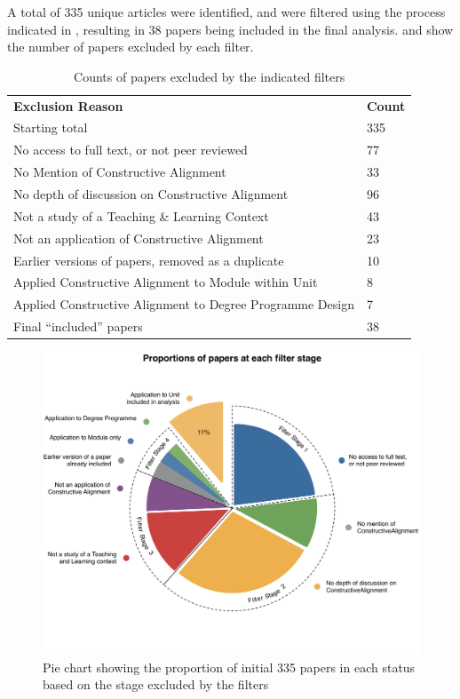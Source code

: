 A total of 335 unique articles were identified, and were filtered using the process indicated in , resulting in 38 papers being included in the final analysis.  and  show the number of papers excluded by each filter.

\begin{table}[p]
	\centering
	\caption{Counts of papers excluded by the indicated filters}
	\label{tbl:exclude_reason}
	\footnotesize
    \begin{tabular}{l|l}
    \textbf{Exclusion Reason} & \textbf{Count} \\
    Starting total & 335 \\
    \hline
    No access to full text, or not peer reviewed & 77 \\
    No Mention of Constructive Alignment & 33 \\
    No depth of discussion on Constructive Alignment & 96 \\
    Not a study of a Teaching \& Learning Context & 43 \\
    Not an application of Constructive Alignment & 23 \\
    Earlier versions of papers, removed as a duplicate & 10 \\
    Applied Constructive Alignment to Module within Unit & 8 \\
    Applied Constructive Alignment to Degree Programme Design & 7 \\ \hline
    Final ``included'' papers & 38 \\
    \end{tabular}
\end{table}

\begin{figure}[p]
	\centering
	\includegraphics[width=\textwidth]{FilterResults}
	\caption{Pie chart showing the proportion of initial 335 papers in each status based on the stage excluded by the filters}
	\label{fig:filter_results}
\end{figure}

